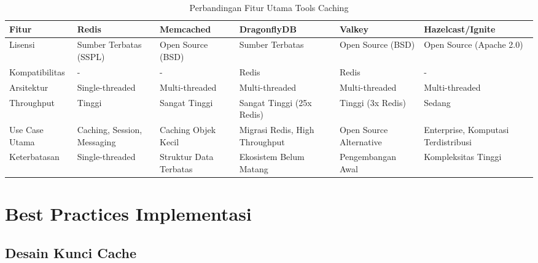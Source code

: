 \documentclass[11pt, a4paper]{book}
\begin{document}
	\begin{table}[htbp]
		\centering
		\caption{Perbandingan Fitur Utama Tools Caching}
		\label{tab:perbandingan-tools}
		\begin{tabularx}{\textwidth}{|l|X|X|X|X|X|}
			\hline
			\textbf{Fitur} & \textbf{Redis} & \textbf{Memcached} & \textbf{DragonflyDB} & \textbf{Valkey} & \textbf{Hazelcast/Ignite} \\ \hline
			Lisensi & Sumber Terbatas (SSPL) & Open Source (BSD) & Sumber Terbatas & Open Source (BSD) & Open Source (Apache 2.0) \\ \hline
			Kompatibilitas & - & - & Redis & Redis & - \\ \hline
			Arsitektur & Single-threaded & Multi-threaded & Multi-threaded & Multi-threaded & Multi-threaded \\ \hline
			Throughput & Tinggi & Sangat Tinggi & Sangat Tinggi (25x Redis) & Tinggi (3x Redis) & Sedang \\ \hline
			Use Case Utama & Caching, Session, Messaging & Caching Objek Kecil & Migrasi Redis, High Throughput & Open Source Alternative & Enterprise, Komputasi Terdistribusi \\ \hline
			Keterbatasan & Single-threaded & Struktur Data Terbatas & Ekosistem Belum Matang & Pengembangan Awal & Kompleksitas Tinggi \\ \hline
		\end{tabularx}
	\end{table}
	
	\chapter{Best Practices Implementasi}
	\label{chap:best-practices}
	
	\section{Desain Kunci Cache}
	\label{sec:desain-kunci}
\end{document}
